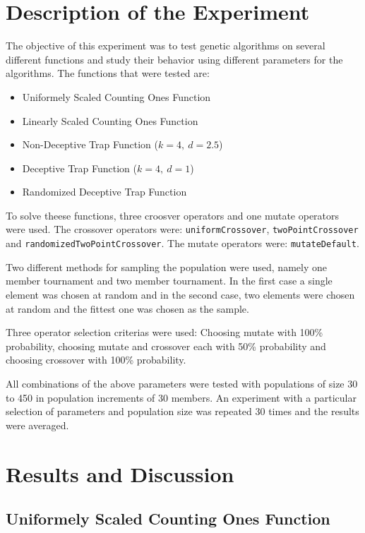 \documentclass[10pt]{article}
\begin{document}
\section{Description of the Experiment}

The objective of this experiment was to test genetic algorithms on several different functions and study their behavior using different parameters for the algorithms. The functions that were tested are:

\begin{itemize}
\item Uniformely Scaled Counting Ones Function
\item Linearly Scaled Counting Ones Function
\item Non-Deceptive Trap Function ($k=4,\ d=2.5$)
\item Deceptive Trap Function ($k=4,\ d=1$)
\item Randomized Deceptive Trap Function
\end{itemize}

To solve theese functions, three croosver operators and one mutate operators were used. The crossover operators were: \verb+uniformCrossover+, \verb+twoPointCrossover+ and \verb+randomizedTwoPointCrossover+. The mutate operators were: \verb+mutateDefault+. 

Two different methods for sampling the population were used, namely one member tournament and two member tournament. In the first case a single element was chosen at random and in the second case, two elements were chosen at random and the fittest one was chosen as the sample.

Three operator selection criterias were used: Choosing mutate with 100\% probability, choosing mutate and crossover each with 50\% probability and choosing crossover with 100\% probability. 

All combinations of the above parameters were tested with populations of size 30 to 450 in population increments of 30 members. An experiment with a particular selection of parameters and population size was repeated 30 times and the results were averaged.
\pagebreak
\section{Results and Discussion}

\subsection{Uniformely Scaled Counting Ones Function}
\end{document}
